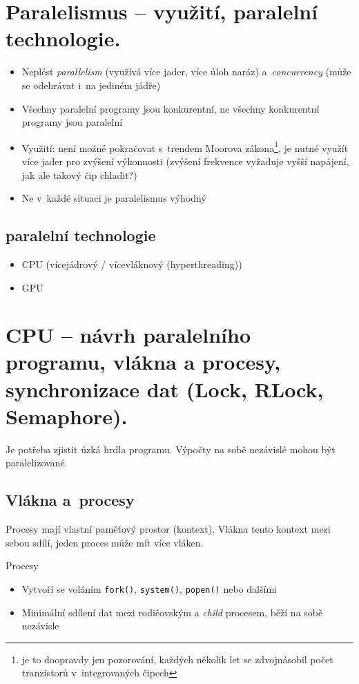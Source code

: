 \section{Paralelismus – využití, paralelní technologie.}
\begin{itemize}
    \item Neplést \textit{parallelism} (využívá více jader, více úloh naráz) a~\textit{concurrency} (může se odehrávat i~na jediném jádře)
    \item Všechny paralelní programy jsou konkurentní, ne všechny konkurentní programy jsou paralelní
    \item Využití: není možné pokračovat s~trendem Moorova zákona\footnote{je to doopravdy jen pozorování, každých několik let se zdvojnásobil počet tranzistorů v~integrovaných čipech}, je nutné využít více jader pro zvýšení výkonnosti (zvýšení frekvence vyžaduje vyšší napájení, jak ale takový čip chladit?)
    \item Ne v~každé situaci je paralelismus výhodný
\end{itemize}

\subsection{paralelní technologie}
\begin{itemize}
    \item CPU (vícejádrový / vícevláknový (hyperthreading))
    \item GPU
\end{itemize}

\section{CPU – návrh paralelního programu, vlákna a procesy, synchronizace dat (Lock, RLock, Semaphore).}
Je potřeba zjistit úzká hrdla programu. Výpočty na sobě nezávislé mohou být paralelizované.

\subsection{Vlákna a~procesy}
Procesy mají vlastní paměťový prostor (kontext). Vlákna tento kontext mezi sebou sdílí, jeden proces může mít více vláken.

Procesy
\begin{itemize}
    \item Vytvoří se voláním \texttt{fork()}, \texttt{system()}, \texttt{popen()} nebo dalšími
    \item Minimální sdílení dat mezi rodičovským a \textit{child} procesem, běží na sobě nezávisle
\end{itemize}

